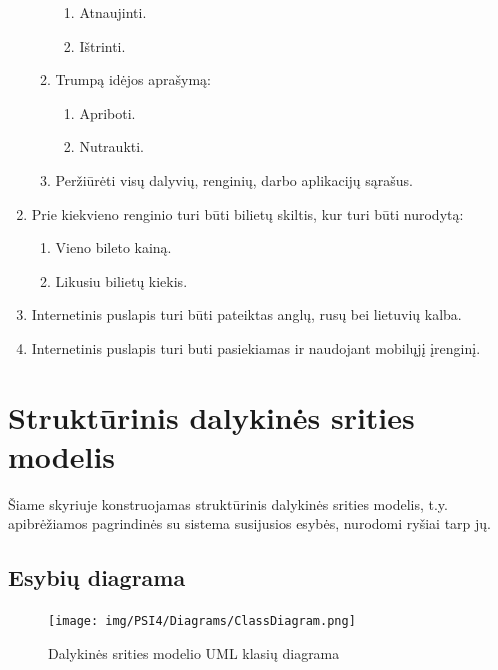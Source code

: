 \documentclass{VUMIFPSkursinis}
\begin{document}
\begin{enumerate}[label=\textbf{FR\arabic*}]
\begin{enumerate}[label*=\textbf{.\arabic*}]
\begin{enumerate}[label*=\textbf{.\arabic*}]
						        \item Atnaujinti.
						        \item Ištrinti.
						    \end{enumerate}
						\item Trumpą idėjos aprašymą:
                            \begin{enumerate}[label*=\textbf{.\arabic*}]
						        \item Apriboti.
						        \item Nutraukti.
						    \end{enumerate}
						\item Peržiūrėti visų dalyvių, renginių, darbo aplikacijų sąrašus.
					\end{enumerate}
			    \item Prie kiekvieno renginio turi būti bilietų skiltis, kur turi būti nurodytą:
					\begin{enumerate}[label*=\textbf{.\arabic*}]
						\item Vieno bileto kainą.
						\item Likusiu bilietų kiekis.
					\end{enumerate}
				\item Internetinis puslapis turi būti pateiktas anglų, rusų bei lietuvių kalba.
				\item  Internetinis puslapis turi buti pasiekiamas ir naudojant mobilųjį įrenginį.
			\end{enumerate}

    \section{Struktūrinis dalykinės srities modelis} \label{strukturinisDSModelis}
		Šiame skyriuje konstruojamas struktūrinis dalykinės srities modelis, t.y. apibrėžiamos pagrindinės su sistema susijusios esybės, nurodomi ryšiai tarp jų.
        \subsection{Esybių diagrama} \label{strukturinisDSModelis_esybiuDiagrama}
            \begin{figure}[H]
                \centering
                \texttt{[image: img/PSI4/Diagrams/ClassDiagram.png]}
                \caption{Dalykinės srities modelio UML klasių diagrama}
                \label{fig:DS-klasiu-diagrama}
            \end{figure}
\end{document}
